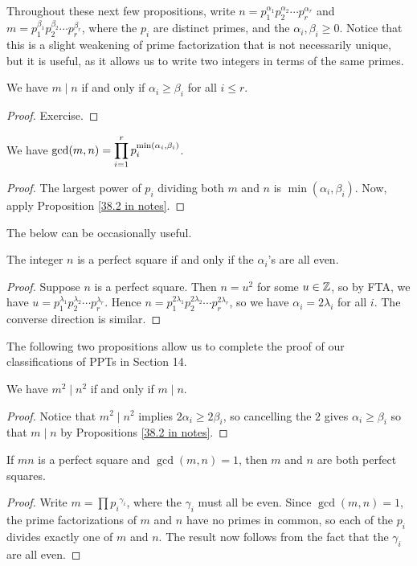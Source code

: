 \documentclass{article}
\begin{document}
Throughout these next few propositions, write $n = p_1^{\alpha_1}p_2^{\alpha_2}\cdots p_r^{\alpha_r}$ and $m = p_1^{\beta_1}p_2^{\beta_2}\cdots p_r^{\beta_r}$, where the $p_i$ are distinct primes, and the $\alpha_i, \beta_i\geq 0$. Notice that this is a slight weakening of prime factorization that is not necessarily unique, but it is useful, as it allows us to write two integers in terms of the same primes.
\begin{proposition}\label{38.2 in notes}
We have $m\mid n$ if and only if $\alpha_i \geq \beta_i$ for all $i\leq r$.
\end{proposition}
\begin{proof}
    Exercise.
\end{proof}

\begin{proposition}
We have $\gcd(m,n) = \displaystyle\prod_{i=1}^r p_i^{ \min(\alpha_i, \beta_i)}$.
\end{proposition}
\begin{proof}
The largest power of $p_i$ dividing both $m$ and $n$ is $\min(\alpha_i, \beta_i)$. Now, apply Proposition \ref{38.2 in notes}.
\end{proof}

The below can be occasionally useful.
\begin{proposition}
The integer $n$ is a perfect square if and only if the $\alpha_i$'s are all even.
\end{proposition}
\begin{proof}
Suppose $n$ is a perfect square. Then $n = u^2$ for some $u\in \mathbb Z$, so by FTA, we have $u = p_1^{\lambda_1}p_2^{\lambda_2}\cdots p_r^{\lambda_r}$. Hence $n = p_1^{2\lambda_1}p_2^{2\lambda_2}\cdots p_r^{2\lambda_r}$, so we have $\alpha_i = 2\lambda_i$ for all $i$. The converse direction is similar.
\end{proof}

The following two propositions allow us to complete the proof of our classifications of PPTs in Section 14.
\begin{proposition}
We have $m^2\mid n^2$ if and only if $m\mid n$.
\end{proposition}
\begin{proof}
Notice that $m^2\mid n^2$ implies $2\alpha_i \geq 2\beta_i$, so cancelling the $2$ gives $\alpha_i \geq \beta_i$ so that $m\mid n$ by Propositions \ref{38.2 in notes}.
\end{proof}

\begin{proposition}
If $mn$ is a perfect square and $\gcd(m,n) = 1$, then $m$ and $n$ are both perfect squares.
\end{proposition}
\begin{proof}
Write $m = \prod {p_i}^{\gamma_i}$, where the $\gamma_i$ must all be even. Since $\gcd(m,n) = 1$, the prime factorizations of $m$ and $n$ have no primes in common, so each of the $p_i$ divides exactly one of $m$ and $n$. The result now follows from the fact that the $\gamma_i$ are all even.
\end{proof}
\end{document}
